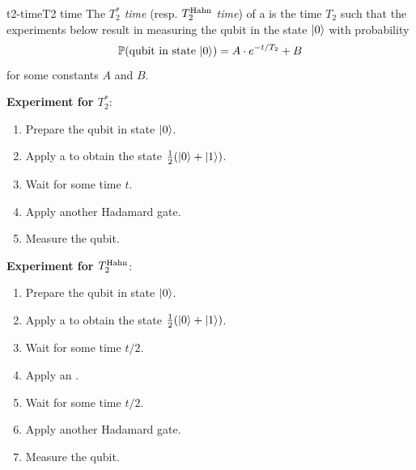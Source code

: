 \begin{topic}{t2-time}{T2 time}
    The \emph{$T_2^*$ time} (resp. \emph{$T_2^\textup{Hahn}$ time}) of a  is the time $T_2$ such that the experiments below result in measuring the qubit in the state $|0\rangle$ with probability
    \[ \mathbb{P}(\textup{qubit in state }|0\rangle) = A \cdot e^{-t / T_2} + B \]
    for some constants $A$ and $B$.

    \textbf{Experiment for $T_2^*$}:
    \begin{enumerate}[label=(\arabic*)]
        \item Prepare the qubit in state $|0\rangle$.
        \item Apply a  to obtain the state $\tfrac{1}{2} (|0\rangle + |1\rangle)$.
        \item Wait for some time $t$.
        \item Apply another Hadamard gate.
        \item Measure the qubit.
    \end{enumerate}
    \textbf{Experiment for $T_2^\textup{Hahn}$}:
    \begin{enumerate}[label=(\arabic*)]
        \item Prepare the qubit in state $|0\rangle$.
        \item Apply a  to obtain the state $\tfrac{1}{2} (|0\rangle + |1\rangle)$.
        \item Wait for some time $t / 2$.
        \item Apply an .
        \item Wait for some time $t / 2$.
        \item Apply another Hadamard gate.
        \item Measure the qubit.
    \end{enumerate}
\end{topic}


